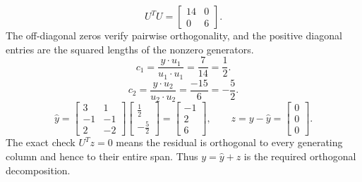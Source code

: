 \[U^TU=\left[\begin{array}{rr}14&0\\0&6\end{array}\right].\]
The off-diagonal zeros verify pairwise orthogonality, and the positive diagonal entries are the squared lengths of the nonzero generators.
\[c_{1}=\frac{y\cdot u_{1}}{u_{1}\cdot u_{1}}=\frac{7}{14}=\frac{1}{2}.\]
\[c_{2}=\frac{y\cdot u_{2}}{u_{2}\cdot u_{2}}=\frac{-15}{6}=- \frac{5}{2}.\]
\[\widehat y=\left[\begin{array}{rr}3&1\\-1&-1\\2&-2\end{array}\right]\left[\begin{array}{r}\frac{1}{2}\\- \frac{5}{2}\end{array}\right]=\left[\begin{array}{r}-1\\2\\6\end{array}\right],\qquad z=y-\widehat y=\left[\begin{array}{r}0\\0\\0\end{array}\right].\]
The exact check $U^Tz=0$ means the residual is orthogonal to every generating column and hence to their entire span. Thus $y=\widehat y+z$ is the required orthogonal decomposition.


